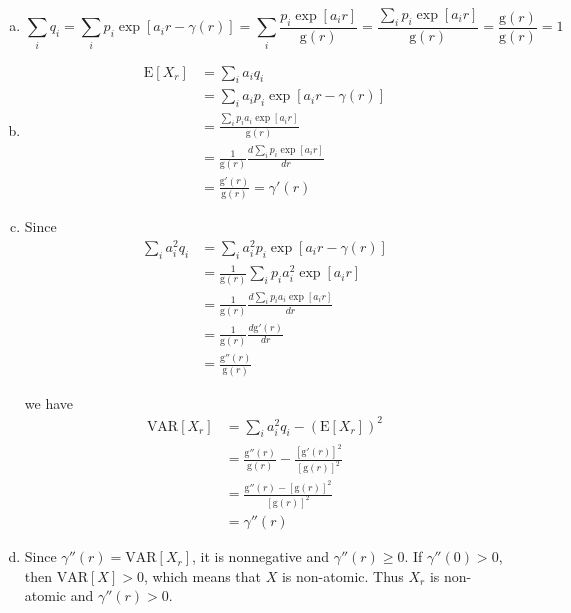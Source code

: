 \documentclass{article}
\begin{document}
    \begin{enumerate}[(a)]
        \item \begin{equation*}
            \sum_iq_i=\sum_ip_i\exp[a_ir-\gamma(r)]=\sum_i\frac{p_i\exp[a_ir]}{\text{g}(r)}=\frac{\sum_ip_i\exp[a_ir]}{\text{g}(r)}=\frac{\text{g}(r)}{\text{g}(r)}=1
        \end{equation*}
        \item \begin{equation*}
            \begin{split}
                \text{E}[X_r]&=\sum_ia_iq_i\\
                &=\sum_ia_ip_i\exp[a_ir-\gamma(r)]\\
                &=\frac{\sum_ip_ia_i\exp[a_ir]}{\text{g}(r)}\\
                &=\frac{1}{{\text{g}(r)}}\frac{d\sum_ip_i\exp[a_ir]}{dr}\\
                &=\frac{\text{g}'(r)}{\text{g}(r)}=\gamma'(r)
            \end{split}
        \end{equation*}
        \item Since
        \begin{equation*}
            \begin{split}
                \sum_ia_i^2q_i &= \sum_ia_i^2p_i\exp[a_ir-\gamma(r)]\\
                &=\frac{1}{\text{g}(r)}\sum_ip_ia_i^2\exp[a_ir]\\
                &=\frac{1}{\text{g}(r)}\frac{d\sum_ip_ia_i\exp[a_ir]}{dr}\\
                &=\frac{1}{\text{g}(r)}\frac{d\text{g}'(r)}{dr}\\
                &=\frac{\text{g}''(r)}{\text{g}(r)}
            \end{split}
        \end{equation*}

        we have
        \begin{equation*}
            \begin{split}
                \text{VAR}[X_r] &=\sum_ia_i^2q_i-(\text{E}[X_r])^2\\
                &=\frac{\text{g}''(r)}{\text{g}(r)}-\frac{[\text{g}'(r)]^2}{[\text{g}(r)]^2}\\
                &=\frac{\text{g}''(r)-[\text{g}(r)]^2}{[\text{g}(r)]^2}\\
                &=\gamma''(r)
            \end{split}
        \end{equation*}
        \item Since $\gamma''(r)=\text{VAR}[X_r]$, it is nonnegative and $\gamma''(r)\geq0$. If $\gamma''(0)>0$, then $\text{VAR}[X]>0$, which means that $X$ is non-atomic. Thus $X_r$ is non-atomic and $\gamma''(r)>0$.
    \end{enumerate}
\end{document}
